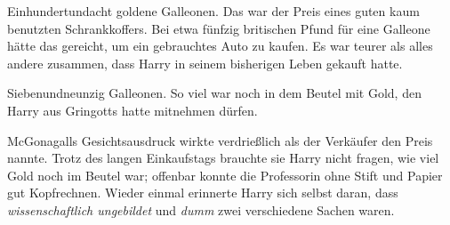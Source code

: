 Einhundertundacht goldene Galleonen. Das war der Preis eines guten kaum benutzten Schrankkoffers. Bei etwa fünfzig britischen Pfund für eine Galleone hätte das gereicht, um ein gebrauchtes Auto zu kaufen. Es war teurer als alles andere zusammen, dass Harry in seinem bisherigen Leben gekauft hatte.

Siebenundneunzig Galleonen. So viel war noch in dem Beutel mit Gold, den Harry aus Gringotts hatte mitnehmen dürfen.

McGonagalls Gesichtsausdruck wirkte verdrießlich als der Verkäufer den Preis nannte. Trotz des langen Einkaufstags brauchte sie Harry nicht fragen, wie viel Gold noch im Beutel war; offenbar konnte die Professorin ohne Stift und Papier gut Kopfrechnen. Wieder einmal erinnerte Harry sich selbst daran, dass \emph{wissenschaftlich ungebildet} und \emph{dumm} zwei verschiedene Sachen waren.


